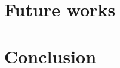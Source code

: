 \documentclass[conference,compsoc]{IEEEtran}
\begin{document}
\section{Future works}
\label{sec:Future}

\section{Conclusion}


\newpage


\end{document}
